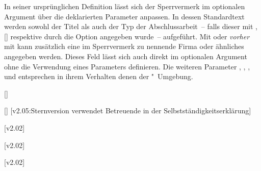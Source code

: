 \begin{DeclareEntity*}{}
\begin{DeclareEntity*}{}
\begin{DeclareEntity*}{}
\begin{Declaration}
\begin{Declaration}
\begin{Declaration}
\begin{Declaration}
\begin{Declaration}
\begin{Declaration}
\begin{Declaration}
In seiner ursprünglichen Definition lässt sich der Sperrvermerk im optionalen 
Argument über die deklarierten Parameter anpassen. In dessen Standardtext 
werden sowohl der Titel als auch der Typ der Abschlussarbeit~-- falls dieser 
mit , [] respektive 
durch die Option  angegeben wurde~-- aufgeführt. Mit 
 oder \emph{vorher} mit  kann 
zusätzlich eine im Sperrvermerk zu nennende Firma oder ähnliches angegeben 
werden. Dieses Feld lässt sich auch direkt im optionalen Argument ohne die 
Verwendung eines Parameters definieren. Die weiteren Parameter 
, 
, 
, 
 und 
 entsprechen in ihrem Verhalten denen 
der "~Umgebung.
\end{Declaration}
\end{Declaration}
\end{Declaration}
\end{Declaration}
\end{Declaration}
\end{Declaration}
\end{Declaration}

\begin{Declaration}
  {[\OList]}
\begin{Declaration}
  {[\OList]}
  [v2.05:Sternversion verwendet Betreuende in der Selbstständigkeitserklärung]
\begin{Declaration}
  {}
\begin{Declaration}
  {}
  [v2.02]
\begin{Declaration}
  {}
  [v2.02]
\begin{Declaration}
  {}
  [v2.02]
\begin{Declaration}
  {}
\begin{Declaration}
  {}
\begin{Declaration}
  {}
\begin{Declaration}
  {}
\begin{Declaration}
  {}
\printdeclarationlist


\end{Declaration}
\end{Declaration}
\end{Declaration}
\end{Declaration}
\end{Declaration}
\end{Declaration}
\end{Declaration}
\end{Declaration}
\end{Declaration}
\end{Declaration}
\end{Declaration}
\end{DeclareEntity*}
\end{DeclareEntity*}
\end{DeclareEntity*}
